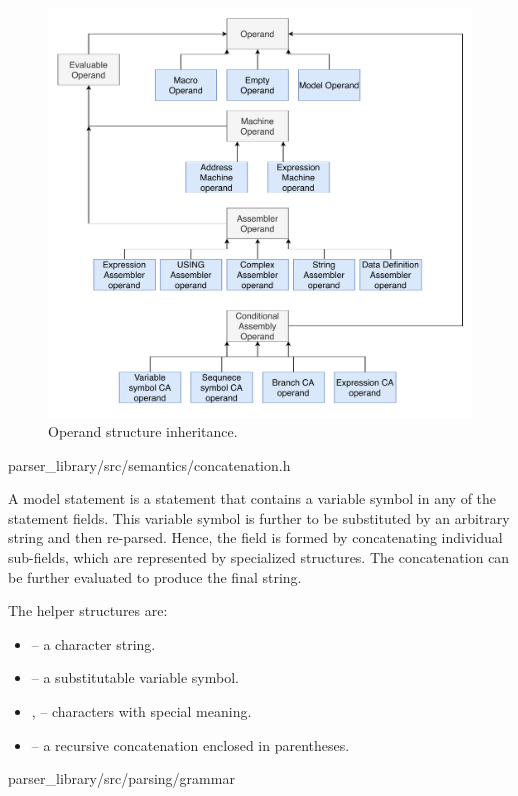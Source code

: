 \begin{figure}
	\centering
	\includegraphics[width=\textwidth]{img/operand_arch}
	\caption{Operand structure inheritance.}
	\label{fig06:operand_arch}
\end{figure}

{parser\_library/src/semantics/concatenation.h}

A model statement is a statement that contains a variable symbol in any of the statement fields. This variable symbol is further to be substituted by an arbitrary string and then re-parsed. Hence, the field is formed by concatenating individual sub-fields, which are represented by specialized structures. The concatenation can be further evaluated to produce the final string.

The helper structures are:
\begin{itemize}
	\item {} -- a character string.
	\item {} -- a substitutable variable symbol.
	\item {},  -- characters with special meaning.
	\item {} -- a recursive concatenation enclosed in parentheses.
\end{itemize}

{parser\_library/src/parsing/grammar}

